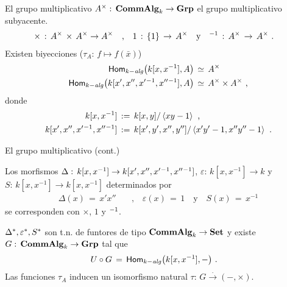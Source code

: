 \begin{frame}{El grupo multiplicativo}
	$A^\times:\,\CommAlg[k]\rightarrow\Grp$ el grupo multiplicativo
	subyacente.
	\begin{align*}
		\times \,:\,A^\times\,\times\,A^\times\rightarrow A^\times
			& \quad\text{,}\quad
		1 \,:\,\{1\}\,\rightarrow\,A^\times \quad\text{y}\quad
		\null^{-1}\,:\,A^\times\,\rightarrow\,A^\times
		\text{ .}
	\end{align*}
	Existen biyecciones ($\tau_A:\,f\mapsto f(\bar x)$)
	\begin{align*}
		\Homalg\big(k[x,x^{-1}],A\big) & \,\simeq\,A^\times \\
		\Homalg\big(k[x',x'',x'\null^{-1},x''\null^{-1}],A\big)
			& \,\simeq\,A^\times\times A^\times
		\text{ ,}
	\end{align*}
	donde
	\begin{align*}
		k[x,x^{-1}] & \,:=\,k[x,y]/\generado{xy-1} \text{ ,} \\
		k[x',x'',x'\null^{-1},x''\null^{-1}] & \,:=\,
			k[x',y',x'',y'']/\generado{x'y'-1,x''y''-1}
		\text{ .}
	\end{align*}
\end{frame}

\begin{frame}{El grupo multiplicativo (cont.)}
	\begin{propoMultiplicativo}\label{propo:multiplicativo}
		Los morfismos
		\begin{math}
			\Delta:\,k[x,x^{-1}]\rightarrow
				k[x',x'',x'\null^{-1},x''\null^{-1}]
		\end{math},
		\begin{math}
			\varepsilon:\,k[x,x^{-1}]\rightarrow k
		\end{math} y
		\begin{math}
			S:\,k[x,x^{-1}]\rightarrow k[x,x^{-1}]
		\end{math} determinados por
		\begin{align*}
			\Delta(x) \,=\,x'x'' & \quad\text{,}\quad
				\varepsilon(x)\,=\,1 \quad\text{y}\quad
				S(x)\,=\,x^{-1}
		\end{align*}
		se corresponden con $\times$, $1$ y $\null^{-1}$.
	\end{propoMultiplicativo}
	\begin{coroMultiplicativo}\label{coro:multiplicativo}
		$\pull\Delta,\pull\varepsilon,\pull S$ son t.n. de funtores de
		tipo $\CommAlg[k]\rightarrow\Set$ y existe
		$G:\,\CommAlg[k]\rightarrow\Grp$ tal que
		\begin{align*}
			U\circ G & \,=\,\Homalg\big(k[x,x^{-1}],-\big)
			\text{ .}
		\end{align*}
		Las funciones $\tau_A$ inducen un isomorfismo natural
		$\tau:\,G\xrightarrow{\cdot}(-,\times)$.
	\end{coroMultiplicativo}
\end{frame}

